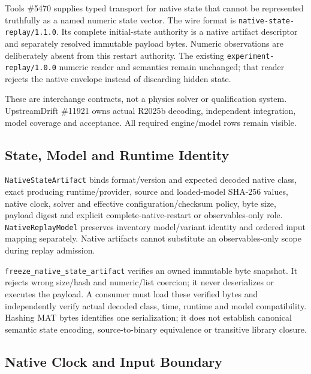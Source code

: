 \documentclass[
  american,
]{article}
\begin{document}
Tools \#5470 supplies typed transport for native state that cannot be
represented truthfully as a named numeric state vector. The wire format
is \texttt{native-state-replay/1.1.0}. Its complete initial-state
authority is a native artifact descriptor and separately resolved
immutable payload bytes. Numeric observations are deliberately absent
from this restart authority. The existing
\texttt{experiment-replay/1.0.0} numeric reader and semantics remain
unchanged; that reader rejects the native envelope instead of discarding
hidden state.

These are interchange contracts, not a physics solver or qualification
system. UpstreamDrift \#11921 owns actual R2025b decoding, independent
integration, model coverage and acceptance. All required engine/model
rows remain visible.

\subsection{State, Model and Runtime
Identity}\label{state-model-and-runtime-identity}

\texttt{NativeStateArtifact} binds format/version and expected decoded
native class, exact producing runtime/provider, source and loaded-model
SHA-256 values, native clock, solver and effective
configuration/checksum policy, byte size, payload digest and explicit
complete-native-restart or observables-only role.
\texttt{NativeReplayModel} preserves inventory model/variant identity
and ordered input mapping separately. Native artifacts cannot substitute
an observables-only scope during replay admission.

\texttt{freeze\_native\_state\_artifact} verifies an owned immutable
byte snapshot. It rejects wrong size/hash and numeric/list coercion; it
never deserializes or executes the payload. A consumer must load these
verified bytes and independently verify actual decoded class, time,
runtime and model compatibility. Hashing MAT bytes identifies one
serialization; it does not establish canonical semantic state encoding,
source-to-binary equivalence or transitive library closure.

\subsection{Native Clock and Input
Boundary}\label{native-clock-and-input-boundary}
\end{document}
